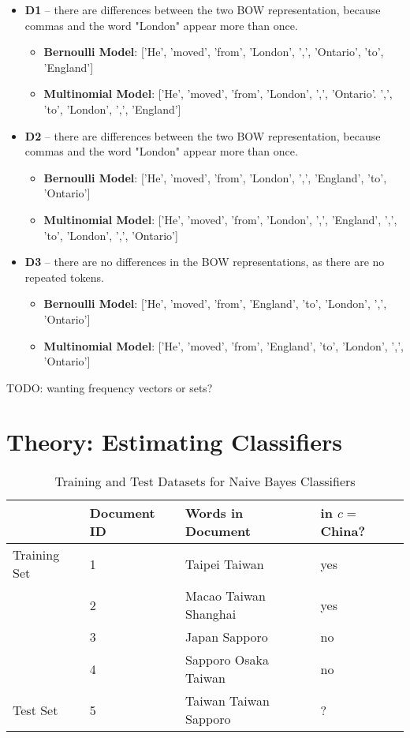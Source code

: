 \documentclass{article}
\begin{document}
\begin{itemize}
	\item \textbf{D1} -- there are differences between the two BOW representation, because commas and the word "London" appear more than once. \begin{itemize}
		\item \textbf{Bernoulli Model}: ['He', 'moved', 'from', 'London', ',', 'Ontario', 'to', 'England']
		\item \textbf{Multinomial Model}: ['He', 'moved', 'from', 'London', ',', 'Ontario'. ',', 'to', 'London', ',', 'England']
		\end{itemize}
	\item \textbf{D2} -- there are differences between the two BOW representation, because commas and the word "London" appear more than once. \begin{itemize}
		\item \textbf{Bernoulli Model}: ['He', 'moved', 'from', 'London', ',', 'England', 'to', 'Ontario']
		\item \textbf{Multinomial Model}: ['He', 'moved', 'from', 'London', ',', 'England', ',', 'to', 'London', ',', 'Ontario']
	  \end{itemize}
	\item \textbf{D3} -- there are no differences in the BOW representations, as there are no repeated tokens.
	\begin{itemize}
	\item \textbf{Bernoulli Model}: ['He', 'moved', 'from', 'England', 'to', 'London', ',', 'Ontario']
	\item \textbf{Multinomial Model}: ['He', 'moved', 'from', 'England', 'to', 'London', ',', 'Ontario']
	\end{itemize}
\end{itemize}

TODO: wanting frequency vectors or sets?

\section{Theory: Estimating Classifiers}

\begin{table}[h]
	\centering
	\begin{tabular}{|l|l|l|l|}
	\hline
	& \textbf{Document ID} & \textbf{Words in Document} & \textbf{in $c=$China?} \\
	\hline
	Training Set & 1 & Taipei Taiwan & yes \\
	& 2 & Macao Taiwan Shanghai & yes \\
	& 3 & Japan Sapporo & no \\
	& 4 & Sapporo Osaka Taiwan & no \\
	\hline
	Test Set & 5 & Taiwan Taiwan Sapporo & ? \\
	\hline 
	\end{tabular}
	\caption{Training and Test Datasets for Naive Bayes Classifiers}
	\label{tab:example_problem}
\end{table}
\end{document}
